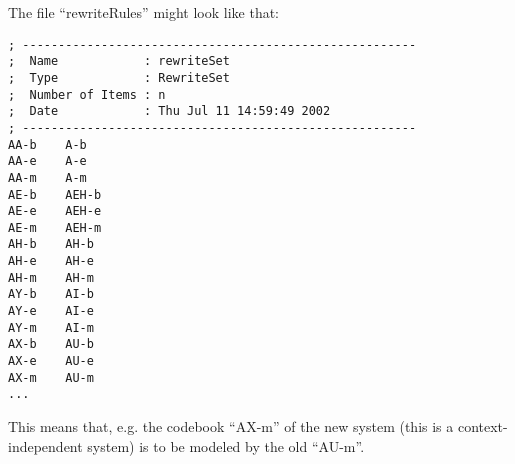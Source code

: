 The file ``rewriteRules'' might look like that:

\begin{verbatim}
; -------------------------------------------------------
;  Name            : rewriteSet
;  Type            : RewriteSet
;  Number of Items : n
;  Date            : Thu Jul 11 14:59:49 2002
; -------------------------------------------------------
AA-b    A-b
AA-e    A-e
AA-m    A-m
AE-b    AEH-b
AE-e    AEH-e
AE-m    AEH-m
AH-b    AH-b
AH-e    AH-e
AH-m    AH-m
AY-b    AI-b
AY-e    AI-e
AY-m    AI-m
AX-b    AU-b
AX-e    AU-e
AX-m    AU-m
...
\end{verbatim}

This means that, e.g. the codebook ``AX-m'' of the new system (this is a
context-independent system) is to be modeled by the old ``AU-m''.

